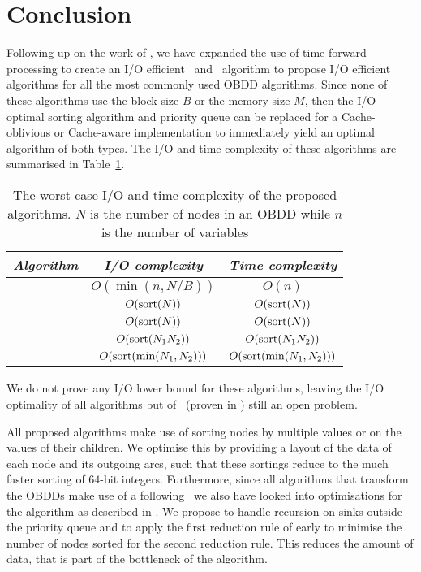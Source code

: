 \section{Conclusion} \label{sec:conclusion}
Following up on the work of \cite{Arge96}, we have expanded the use of
time-forward processing to create an I/O efficient \Reduce\ and \Apply\
algorithm to propose I/O efficient algorithms for all the most commonly used
OBDD algorithms. Since none of these algorithms use the block size $B$ or the
memory size $M$, then the I/O optimal sorting algorithm and priority queue can
be replaced for a Cache-oblivious or Cache-aware implementation to immediately
yield an optimal algorithm of both types. The I/O and time complexity of these
algorithms are summarised in Table~\ref{tab:summary_efficiency}.

\begin{table}[ht!]
  \centering
  \begin{tabular}{c | c | c}
    \emph{Algorithm} & \emph{I/O complexity} & \emph{Time complexity}
    \\ \hline
    \Evaluate & $O(\min(n, N/B))$ & $O(n)$
    \\
    \Reduce & $O(\text{sort}(N))$ & $O(\text{sort}(N))$
    \\
    \Restrict & $O(\text{sort}(N))$ & $O(\text{sort}(N))$
    \\
    \Apply & $O(\text{sort}(N_1 N_2))$ & $O(\text{sort}(N_1 N_2))$
    \\
    \Equal & $O(\text{sort}(\min(N_1, N_2)))$ & $O(\text{sort}(\min(N_1, N_2)))$
    \\
  \end{tabular}
  \caption{The worst-case I/O and time complexity of the proposed algorithms.
    $N$ is the number of nodes in an OBDD while $n$ is the number of variables}
  \label{tab:summary_efficiency}
\end{table}

We do not prove any I/O lower bound for these algorithms, leaving the I/O
optimality of all algorithms but of \Reduce\ (proven in \cite{Arge96}) still an
open problem.

All proposed algorithms make use of sorting nodes by multiple values or on the
values of their children. We optimise this by providing a layout of the data of
each node and its outgoing arcs, such that these sortings reduce to the much
faster sorting of $64$-bit integers. Furthermore, since all algorithms that
transform the OBDDs make use of a following \Reduce\ we also have looked into
optimisations for the algorithm as described in \cite{Arge96}. We propose to
handle recursion on sinks outside the priority queue and to apply the first
reduction rule of \cite{Bryant86} early to minimise the number of nodes sorted
for the second reduction rule. This reduces the amount of data, that is part of
the bottleneck of the algorithm.

